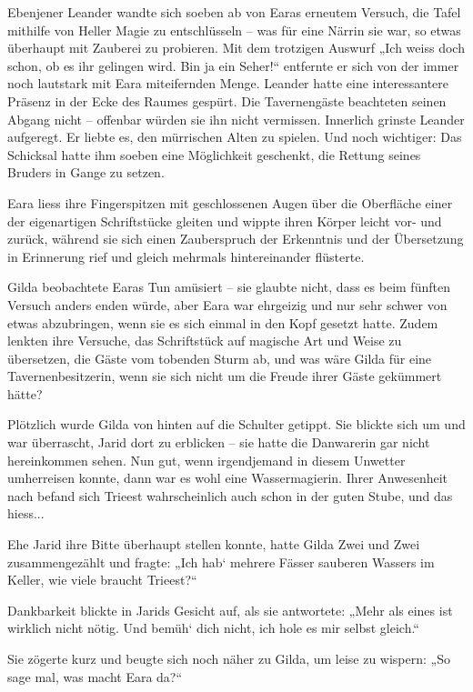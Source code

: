 Ebenjener Leander wandte sich soeben ab von Earas erneutem Versuch, die Tafel mithilfe von Heller Magie zu entschlüsseln – was für eine Närrin sie war, so etwas überhaupt mit Zauberei zu probieren. Mit dem trotzigen Auswurf „Ich weiss doch schon, ob es ihr gelingen wird. Bin ja ein Seher!“ entfernte er sich von der immer noch lautstark mit Eara miteifernden Menge. Leander hatte eine interessantere Präsenz in der Ecke des Raumes gespürt. Die Tavernengäste beachteten seinen Abgang nicht – offenbar würden sie ihn nicht vermissen. Innerlich grinste Leander aufgeregt. Er liebte es, den mürrischen Alten zu spielen. Und noch wichtiger: Das Schicksal hatte ihm soeben eine Möglichkeit geschenkt, die Rettung seines Bruders in Gange zu setzen.



Eara liess ihre Fingerspitzen mit geschlossenen Augen über die Oberfläche einer der eigenartigen Schriftstücke gleiten und wippte ihren Körper leicht vor- und zurück, während sie sich einen Zauberspruch der Erkenntnis und der Übersetzung in Erinnerung rief und gleich mehrmals hintereinander flüsterte.

Gilda beobachtete Earas Tun amüsiert – sie glaubte nicht, dass es beim fünften Versuch anders enden würde, aber Eara war ehrgeizig und nur sehr schwer von etwas abzubringen, wenn sie es sich einmal in den Kopf gesetzt hatte. Zudem lenkten ihre Versuche, das Schriftstück auf magische Art und Weise zu übersetzen, die Gäste vom tobenden Sturm ab, und was wäre Gilda für eine Tavernenbesitzerin, wenn sie sich nicht um die Freude ihrer Gäste gekümmert hätte?

Plötzlich wurde Gilda von hinten auf die Schulter getippt. Sie blickte sich um und war überrascht, Jarid dort zu erblicken – sie hatte die Danwarerin gar nicht hereinkommen sehen. Nun gut, wenn irgendjemand in diesem Unwetter umherreisen konnte, dann war es wohl eine Wassermagierin. Ihrer Anwesenheit nach befand sich Trieest wahrscheinlich auch schon in der guten Stube, und das hiess...

Ehe Jarid ihre Bitte überhaupt stellen konnte, hatte Gilda Zwei und Zwei zusammengezählt und fragte: „Ich hab‘ mehrere Fässer sauberen Wassers im Keller, wie viele braucht Trieest?“

Dankbarkeit blickte in Jarids Gesicht auf, als sie antwortete: „Mehr als eines ist wirklich nicht nötig. Und bemüh‘ dich nicht, ich hole es mir selbst gleich.“

Sie zögerte kurz und beugte sich noch näher zu Gilda, um leise zu wispern: „So sage mal, was macht Eara da?“

